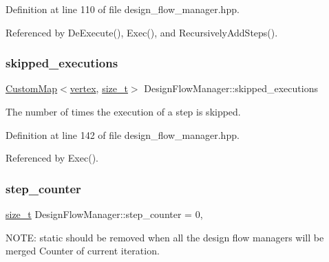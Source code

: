 Definition at line 110 of file design\+\_\+flow\+\_\+manager.\+hpp.



Referenced by De\+Execute(), Exec(), and Recursively\+Add\+Steps().

\mbox{\label{classDesignFlowManager_a3819ea61eec3ea670467397a954b3e84}} 
\subsubsection{\texorpdfstring{skipped\+\_\+executions}{skipped\_executions}}
{\footnotesize\ttfamily \hyperlink{custom__map_8hpp_a18ca01763abbe3e5623223bfe5aaac6b}{Custom\+Map}$<$\hyperlink{graph_8hpp_abefdcf0544e601805af44eca032cca14}{vertex}, \hyperlink{tutorial__fpt__2017_2intro_2sixth_2test_8c_a7c94ea6f8948649f8d181ae55911eeaf}{size\+\_\+t}$>$ Design\+Flow\+Manager\+::skipped\+\_\+executions\hspace{0.3cm}{\ttfamily [private]}}



The number of times the execution of a step is skipped. 



Definition at line 142 of file design\+\_\+flow\+\_\+manager.\+hpp.



Referenced by Exec().

\mbox{\label{classDesignFlowManager_a7f27cfe1cb613464bd12f024a14a1ac0}} 
\subsubsection{\texorpdfstring{step\+\_\+counter}{step\_counter}}
{\footnotesize\ttfamily \hyperlink{tutorial__fpt__2017_2intro_2sixth_2test_8c_a7c94ea6f8948649f8d181ae55911eeaf}{size\+\_\+t} Design\+Flow\+Manager\+::step\+\_\+counter = 0\hspace{0.3cm}{\ttfamily [static]}, {\ttfamily [private]}}



N\+O\+TE\+: static should be removed when all the design flow managers will be merged Counter of current iteration. 



